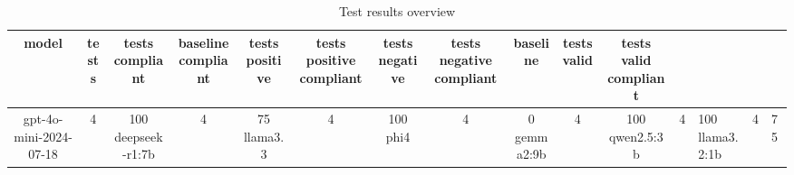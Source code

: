 
  \begin{table}[h!]
  \centering
  \begin{tabular}{|c|c|c|c|c|c|c|c|c|c|c|}
  \hline
  model & tests & tests compliant & baseline compliant & tests positive & tests positive compliant & tests negative & tests negative compliant & baseline & tests valid & tests valid compliant \\
  \hline
  gpt-4o-mini-2024-07-18 & 4 & 100%
\hline
deepseek-r1:7b & 4 & 75%
\hline
llama3.3 & 4 & 100%
\hline
phi4 & 4 & 0%
\hline
gemma2:9b & 4 & 100%
\hline
qwen2.5:3b & 4 & 100%
\hline
llama3.2:1b & 4 & 75%
  \end{tabular}
  \caption{Test results overview}
  
  \end{table}
  
